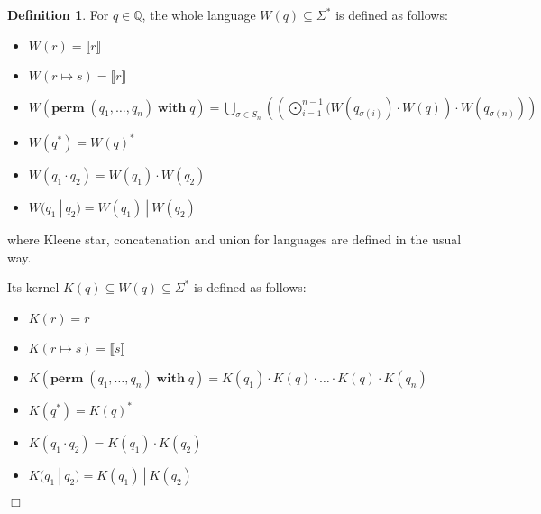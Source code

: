 \documentclass[a4paper,11pt] {article}
\theoremstyle{definition}
\newtheorem{definition}[theorem]{Definition}
\newcommand{\perm}{ \textbf{perm}\; }
\newcommand{\with}{ \;\textbf{with}\; }
\begin{document}
\begin{definition}
  For $q \in \mathbb{Q}$, the whole language $W(q) \subseteq \Sigma^*$
  is defined as follows:
  \begin{itemize}
  \item $W(r) = \llbracket r \rrbracket$
  \item $W(r \mapsto s) = \llbracket r \rrbracket$
  \item $W(\perm(q_1, \ldots, q_n) \with q) =
    \bigcup_{\sigma \in S_n} \left( \left(\bigodot_{i=1}^{n-1} (W(q_{\sigma(i)})
    \cdot W(q) \right)
    \cdot W(q_{\sigma(n)}) \right)$
  \item $W(q^*) = {W(q)}^*$
  \item $W(q_1 \cdot q_2) = W(q_1) \cdot W(q_2)$
  \item $W(q_1 ~|~ q_2) = W(q_1) ~|~ W(q_2)$
  \end{itemize}
  where Kleene star, concatenation and union for languages are defined
  in the usual way.
  
  Its kernel $K(q) \subseteq W(q) \subseteq \Sigma^*$ is defined as follows:
  \begin{itemize}
  \item $K(r) = r$
  \item $K(r \mapsto s) = \llbracket s \rrbracket$
  \item $K(\perm (q_1, \ldots, q_n) \with q) =
    K(q_1) \cdot K(q) \cdot \ldots \cdot
    K(q) \cdot K(q_n)$  
  \item $K(q^*) = {K(q)}^*$
  \item $K(q_1 \cdot q_2) = K(q_1) \cdot K(q_2)$
  \item $K(q_1 ~|~ q_2) = K(q_1) ~|~ K(q_2)$
  \end{itemize}
  \begin{flushright} $\Box$ \end{flushright}
\end{definition}
\end{document}
